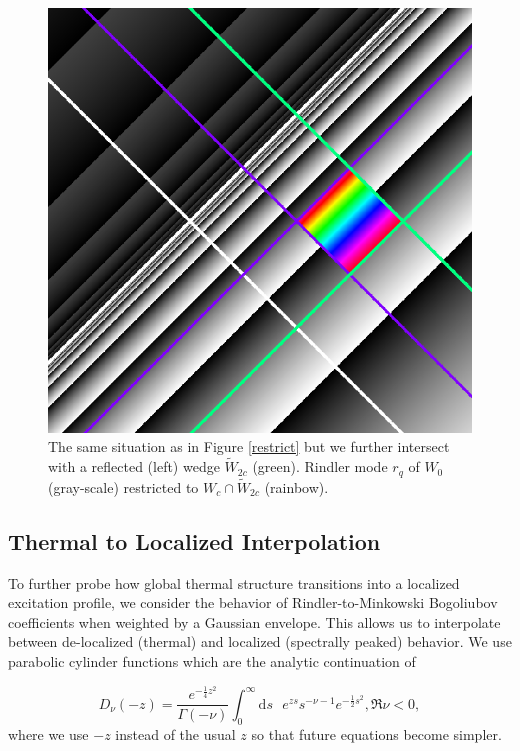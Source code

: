 \documentclass[12pt,a4paper]{article}
\newcommand{\dv}[1]{\mathrm{d} #1 \text{ }}
\begin{document}
\begin{figure}[h]
  \centering
\includegraphics[scale=0.4]{diamond_in_wedge.png}
\caption{The same situation as in Figure \ref{restrict} but we further intersect with a reflected (left) wedge $\widetilde{W}_{2c}$ (green). Rindler mode $r_q$ of $W_0$ (gray-scale) restricted to $W_c \cap \widetilde{W}_{2c}$ (rainbow).}
\label{diamond}
\end{figure}


\subsection{Thermal to Localized Interpolation}
To further probe how global thermal structure transitions into a localized excitation profile, we consider the behavior of Rindler-to-Minkowski Bogoliubov coefficients when weighted by a Gaussian envelope. This allows us to interpolate between de-localized (thermal) and localized (spectrally peaked) behavior. We use parabolic cylinder functions \cite{AbramowitzStegun1964,Olver1959UniformAE} which are the analytic continuation of 

\begin{equation}
D_\nu(-z) = \frac{e^{-\frac{1}{4}z^2}}{\Gamma\left(-\nu\right)} \int_0^\infty  \dv{s} e^{zs} s^{-\nu - 1} e^{-\frac{1}{2} s^2}, \mathfrak{R}\nu < 0,
\end{equation}
where we use $-z$ instead of the usual $z$ so that future equations become simpler.
\end{document}
